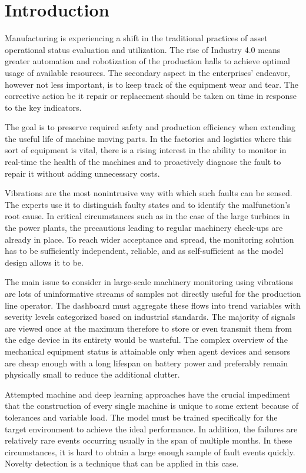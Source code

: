 \chapter{Introduction}
Manufacturing is experiencing a shift in the traditional practices of asset operational status evaluation and utilization. The rise of Industry 4.0 means greater automation and robotization of the production halls to achieve optimal usage of available resources. The secondary aspect in the enterprises' endeavor, however not less important, is to keep track of the equipment wear and tear. The corrective action be it repair or replacement should be taken on time in response to the key indicators. 

The goal is to preserve required safety and production efficiency when extending the useful life of machine moving parts. In the factories and logistics where this sort of equipment is vital, there is a rising interest in the ability to monitor in real-time the health of the machines and to proactively diagnose the fault to repair it without adding unnecessary costs. 

Vibrations are the most nonintrusive way with which such faults can be sensed. The experts use it to distinguish faulty states and to identify the malfunction's root cause. In critical circumstances such as in the case of the large turbines in the power plants, the precautions leading to regular machinery check-ups are already in place. To reach wider acceptance and spread, the monitoring solution has to be sufficiently independent, reliable, and as self-sufficient as the model design allows it to be.

The main issue to consider in large-scale machinery monitoring using vibrations are lots of uninformative streams of samples not directly useful for the production line operator. The dashboard must aggregate these flows into trend variables with severity levels categorized based on industrial standards. The majority of signals are viewed once at the maximum therefore to store or even transmit them from the edge device in its entirety would be wasteful. The complex overview of the mechanical equipment status is attainable only when agent devices and sensors are cheap enough with a long lifespan on battery power and preferably remain physically small to reduce the additional clutter.

Attempted machine and deep learning approaches have the crucial impediment that the construction of every single machine is unique to some extent because of tolerances and variable load. The model must be trained specifically for the target environment to achieve the ideal performance. In addition, the failures are relatively rare events occurring usually in the span of multiple months. In these circumstances, it is hard to obtain a large enough sample of fault events quickly. Novelty detection is a technique that can be applied in this case.

